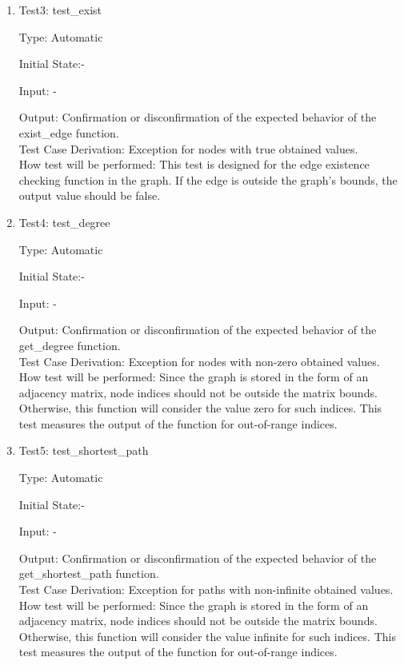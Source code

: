 \documentclass[12pt, titlepage]{article}
\begin{document}
\begin{enumerate}
\item{Test3: test\_exist}

Type: Automatic
					
Initial State:-
					
Input: -
					
Output: Confirmation or disconfirmation of the expected behavior of the {exist\_edge} function.\\
Test Case Derivation: Exception for nodes with true obtained values.\\
How test will be performed: This test is designed for the edge existence checking function in the graph. If the edge is outside the graph's bounds, the output value should be false.
							
\item{Test4: test\_degree}

Type: Automatic
					
Initial State:-
					
Input: -
					
Output: Confirmation or disconfirmation of the expected behavior of the {get\_degree } function.\\
Test Case Derivation: Exception for nodes with non-zero obtained values.\\
How test will be performed: Since the graph is stored in the form of an adjacency matrix, node indices should not be outside the matrix bounds. Otherwise, this function will consider the value zero for such indices. This test measures the output of the function for out-of-range indices.
					


\item{Test5: test\_shortest\_path}

Type: Automatic
					
Initial State:-
					
Input: -
					
Output: Confirmation or disconfirmation of the expected behavior of the {get\_shortest\_path} function.\\
Test Case Derivation: Exception for paths with non-infinite obtained values.\\
How test will be performed: Since the graph is stored in the form of an adjacency matrix, node indices should not be outside the matrix bounds. Otherwise, this function will consider the value infinite for such indices. This test measures the output of the function for out-of-range indices.
				



    
\end{enumerate}
\end{document}
